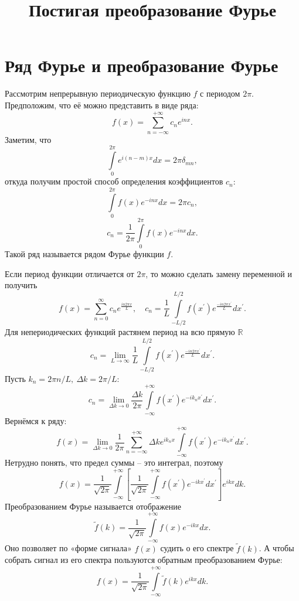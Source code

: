 

\title{Постигая преобразование Фурье}


\maketitle
\tableofcontents
\section{Ряд Фурье и преобразование Фурье}
Рассмотрим непрерывную периодическую функцию \( f \) с периодом \( 2\pi \).
Предположим, что её можно представить в виде ряда:
\[
    f(x) = \sum\limits_{n=-\infty}^{+\infty} c_n e^{inx}.
\]
Заметим, что
\[
    \int\limits_0^{2\pi} e^{i(n-m)x} dx = 2\pi\delta_{mn},
\]
откуда получим простой способ определения коэффициентов \( c_n \):
\[
    \int\limits_0^{2\pi} f(x) e^{-inx} dx = 2\pi c_n,
\]
\[
    c_n = \frac{1}{2\pi}\int\limits_0^{2\pi} f(x) e^{-inx} dx.
\]
Такой ряд называется рядом Фурье функции \( f \).

Если период функции отличается от \( 2\pi \), то можно сделать замену
переменной и получить
\[
    f(x) = \sum\limits_{n=0}^\infty c_n e^\frac{in2\pi x}{L},\quad
    c_n = \frac{1}{L}\int\limits_{-L/2}^{L/2} f(x^\prime) e^\frac{-in2\pi x^\prime}{L} dx^\prime.
\]
Для непериодических функций растянем период на всю прямую \( \mathbb{R} \)
\[
   c_n = \lim_{L\to\infty} \frac{1}{L}\int\limits_{-L/2}^{L/2} f(x^\prime) e^\frac{-in2\pi x^\prime}{L} dx^\prime.
\]
Пусть \( k_n = 2\pi n / L,\ \Delta k = 2\pi / L \):
\[
   c_n = \lim_{\Delta k \to 0} \frac{\Delta k}{2\pi}\int\limits_{-\infty}^{+\infty} f(x^\prime) e^{-ik_nx^\prime} dx^\prime.
\]
Вернёмся к ряду:
\[
    f(x) = \lim_{\Delta k\to 0}\frac{1}{2\pi}\sum\limits_{n=-\infty}^{+\infty} \Delta k
    e^{ik_nx}\int\limits_{-\infty}^{+\infty} f(x^\prime) e^{-ik_nx^\prime}
    dx^\prime.
\]
Нетрудно понять, что предел суммы -- это интеграл, поэтому
\[
    f(x) = \frac{1}{\sqrt{2\pi}}\int\limits_{-\infty}^{+\infty}  \left[\frac{1}{\sqrt{2\pi}}\int\limits_{-\infty}^{+\infty} f(x^\prime) e^{-ikx^\prime} dx^\prime\right] e^{ikx} dk.
\]
Преобразованием Фурье называется отображение
\[
    \tilde{f}(k) = \frac{1}{\sqrt{2\pi}}\int\limits_{-\infty}^{+\infty} f(x) e^{-ikx} dx.
\]
Оно позволяет по «форме сигнала» \(f(x)\) судить о его спектре
\(\tilde{f}(k)\). А чтобы собрать сигнал из его спектра пользуются обратным
преобразованием Фурье:
\[
    f(x) = \frac{1}{\sqrt{2\pi}}\int\limits_{-\infty}^{+\infty} \tilde{f}(k) e^{ikx} dk.
\]

